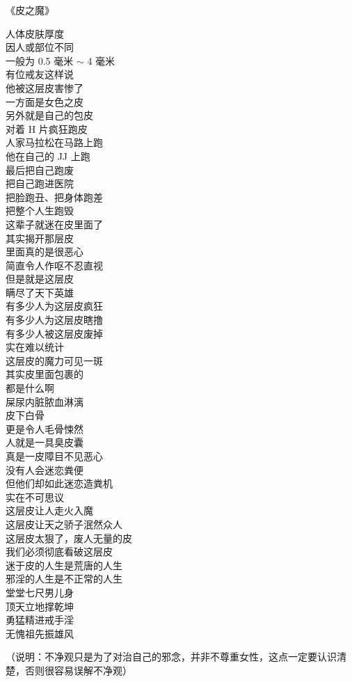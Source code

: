 \begin{center}
    《皮之魔》\it
    \begin{multicols}{2}
        人体皮肤厚度 \\ 因人或部位不同 \\ 一般为 0.5 毫米 $\sim$ 4 毫米 \\ 有位戒友这样说 \\ 他被这层皮害惨了 \\ 一方面是女色之皮 \\ 另外就是自己的包皮 \\ 对着 H 片疯狂跑皮 \\ 人家马拉松在马路上跑 \\ 他在自己的 JJ 上跑 \\ 最后把自己跑废 \\ 把自己跑进医院 \\ 把脸跑丑、把身体跑差 \\ 把整个人生跑毁 \\ 这辈子就迷在皮里面了 \\ 其实揭开那层皮 \\ 里面真的是很恶心 \\ 简直令人作呕不忍直视 \\ 但是就是这层皮 \\ 瞒尽了天下英雄 \\ 有多少人为这层皮疯狂 \\ 有多少人为这层皮瞎撸 \\ 有多少人被这层皮废掉 \\ 实在难以统计 \\ 这层皮的魔力可见一斑 \\ 其实皮里面包裹的 \\ 都是什么啊 \\ 屎尿内脏脓血淋漓 \\ 皮下白骨 \\ 更是令人毛骨悚然 \\ 人就是一具臭皮囊 \\ 真是一皮障目不见恶心 \\ 没有人会迷恋粪便 \\ 但他们却如此迷恋造粪机 \\ 实在不可思议 \\ 这层皮让人走火入魔 \\ 这层皮让天之骄子泯然众人 \\ 这层皮太狠了，废人无量的皮 \\ 我们必须彻底看破这层皮 \\ 迷于皮的人生是荒唐的人生 \\ 邪淫的人生是不正常的人生 \\ 堂堂七尺男儿身 \\ 顶天立地撑乾坤 \\ 勇猛精进戒手淫 \\ 无愧祖先振雄风
    \end{multicols}
\end{center}

（说明：不净观只是为了对治自己的邪念，并非不尊重女性，这点一定要认识清楚，否则很容易误解不净观）
